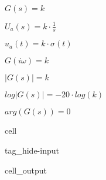 \documentclass[letterpaper,10pt,english]{jupyterBook}
\begin{document}
\begin{DUlineblock}{0em}
\item[] 
\end{DUlineblock}

\sphinxAtStartPar
\(G(s) = k\)

\begin{DUlineblock}{0em}
\item[] 
\end{DUlineblock}

\sphinxAtStartPar
\(U_a(s) = k\cdot\frac{1}{s}\)

\sphinxAtStartPar
\(u_a(t) = k\cdot \sigma(t)\)

\begin{DUlineblock}{0em}
\item[] 
\end{DUlineblock}

\sphinxAtStartPar
\(G(i\omega) = k\)

\begin{DUlineblock}{0em}
\item[] 
\end{DUlineblock}

\sphinxAtStartPar
\(|G(s)| = k\)

\sphinxAtStartPar
\(log|G(s)| = - 20\cdot log(k)\)

\begin{DUlineblock}{0em}
\item[] 
\end{DUlineblock}

\sphinxAtStartPar
\(arg(G(s)) = 0\)

\begin{sphinxuseclass}{cell}
\begin{sphinxuseclass}{tag_hide-input}\begin{sphinxVerbatimOutput}

\begin{sphinxuseclass}{cell_output}
\begin{sphinxVerbatim}
\end{sphinxVerbatim}

\noindent{}

\end{sphinxuseclass}\end{sphinxVerbatimOutput}

\end{sphinxuseclass}
\end{sphinxuseclass}
\begin{DUlineblock}{0em}
\item[] 
\end{DUlineblock}
\end{document}
